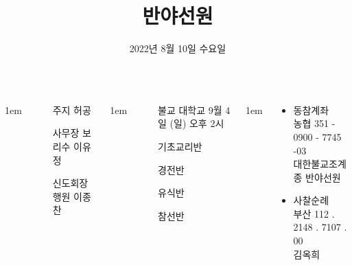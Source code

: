 \documentclass[	20pt, 
							a1paper, 
							portrait, %
							margin=0mm, %
							innermargin=10mm,  		%
							colspace=5mm, 
							subcolspace=0mm
							]{tikzposter}
\title{반야선원}
\author{ 2022년 8월 10일 수요일 }
\begin{document}
	\maketitle

	\begin{columns}


			{
					\setlength{\leftmargini}{7em}
					\setlength{\labelsep} {1em}
				\begin{LARGE}
					\begin{itemize}
					\item [주지] 허공 
					\item [사무장] 보리수 이유정
					\item [신도회장] 행원 이종찬
					\end{itemize}
				\end{LARGE}
			}

			{
					\setlength{\leftmargini}{9em}
					\setlength{\labelsep} {1em}
				\begin{LARGE}
					\begin{itemize}
					\item [불교 대학교] 9월 4일 (일) 오후 2시
					\item [기초교리반] 
					\item [경전반] 
					\item [유식반]
					\item [참선반]
					\end{itemize}
				\end{LARGE}
			}

			{
					\setlength{\leftmargini}{4em}
					\setlength{\labelsep} {1em}
				\begin{LARGE}
					\begin{itemize}
					\item 동참계좌\\
							농협 351 - 0900 - 7745 -03 \\
							대한불교조계종 반야선원
					\item 사찰순례\\
							부산  112 . 2148 . 7107 . 00 \\
							김옥희
					\end{itemize}
				\end{LARGE}
			}







\end{columns}
\end{document}
